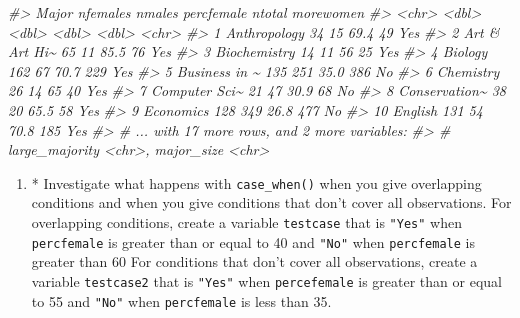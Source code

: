 \documentclass[
]{book}
\newenvironment{Shaded}{\begin{snugshade}}{\end{snugshade}}
\newcommand{\CommentTok}[1]{\textcolor[rgb]{0.56,0.35,0.01}{\textit{#1}}}
\providecommand{\tightlist}{%
  \setlength{\itemsep}{0pt}\setlength{\parskip}{0pt}}
\begin{document}
\begin{Shaded}
\begin{Highlighting}[]
\CommentTok{\#\textgreater{}    Major         nfemales nmales percfemale ntotal morewomen}
\CommentTok{\#\textgreater{}    \textless{}chr\textgreater{}            \textless{}dbl\textgreater{}  \textless{}dbl\textgreater{}      \textless{}dbl\textgreater{}  \textless{}dbl\textgreater{} \textless{}chr\textgreater{}    }
\CommentTok{\#\textgreater{}  1 Anthropology        34     15       69.4     49 Yes      }
\CommentTok{\#\textgreater{}  2 Art \& Art Hi\textasciitilde{}       65     11       85.5     76 Yes      }
\CommentTok{\#\textgreater{}  3 Biochemistry        14     11       56       25 Yes      }
\CommentTok{\#\textgreater{}  4 Biology            162     67       70.7    229 Yes      }
\CommentTok{\#\textgreater{}  5 Business in \textasciitilde{}      135    251       35.0    386 No       }
\CommentTok{\#\textgreater{}  6 Chemistry           26     14       65       40 Yes      }
\CommentTok{\#\textgreater{}  7 Computer Sci\textasciitilde{}       21     47       30.9     68 No       }
\CommentTok{\#\textgreater{}  8 Conservation\textasciitilde{}       38     20       65.5     58 Yes      }
\CommentTok{\#\textgreater{}  9 Economics          128    349       26.8    477 No       }
\CommentTok{\#\textgreater{} 10 English            131     54       70.8    185 Yes      }
\CommentTok{\#\textgreater{} \# ... with 17 more rows, and 2 more variables:}
\CommentTok{\#\textgreater{} \#   large\_majority \textless{}chr\textgreater{}, major\_size \textless{}chr\textgreater{}}
\end{Highlighting}
\end{Shaded}

\begin{enumerate}
\def\labelenumi{\arabic{enumi}.}
\setcounter{enumi}{4}
\tightlist
\item
  * Investigate what happens with \texttt{case\_when()} when you give overlapping conditions and when you give conditions that don't cover all observations. For overlapping conditions, create a variable \texttt{testcase} that is \texttt{"Yes"} when \texttt{percfemale} is greater than or equal to 40 and \texttt{"No"} when \texttt{percfemale} is greater than 60 For conditions that don't cover all observations, create a variable \texttt{testcase2} that is \texttt{"Yes"} when \texttt{percefemale} is greater than or equal to 55 and \texttt{"No"} when \texttt{percfemale} is less than 35.
\end{enumerate}
\end{document}

